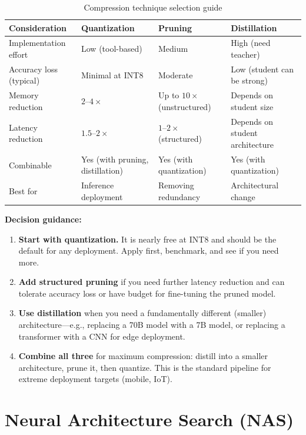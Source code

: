 \begin{table}[H]
\centering
\caption{Compression technique selection guide}
\begin{tabularx}{\textwidth}{lXXX}
\toprule
\textbf{Consideration} & \textbf{Quantization} & \textbf{Pruning} & \textbf{Distillation} \\
\midrule
Implementation effort & Low (tool-based) & Medium & High (need teacher) \\
Accuracy loss (typical) & Minimal at INT8 & Moderate & Low (student can be strong) \\
Memory reduction & $2$--$4\times$ & Up to $10\times$ (unstructured) & Depends on student size \\
Latency reduction & $1.5$--$2\times$ & $1$--$2\times$ (structured) & Depends on student architecture \\
Combinable & Yes (with pruning, distillation) & Yes (with quantization) & Yes (with quantization) \\
Best for & Inference deployment & Removing redundancy & Architectural change \\
\bottomrule
\end{tabularx}
\end{table}

\textbf{Decision guidance:}
\begin{enumerate}
    \item \textbf{Start with quantization.} It is nearly free at INT8 and should be the default for any deployment. Apply first, benchmark, and see if you need more.
    \item \textbf{Add structured pruning} if you need further latency reduction and can tolerate accuracy loss or have budget for fine-tuning the pruned model.
    \item \textbf{Use distillation} when you need a fundamentally different (smaller) architecture---e.g., replacing a 70B model with a 7B model, or replacing a transformer with a CNN for edge deployment.
    \item \textbf{Combine all three} for maximum compression: distill into a smaller architecture, prune it, then quantize. This is the standard pipeline for extreme deployment targets (mobile, IoT).
\end{enumerate}

\section{Neural Architecture Search (NAS)}
\label{sec:nas}

